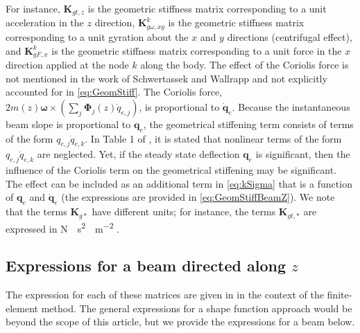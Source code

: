 \documentclass[wes, manuscript]{copernicus}
\renewcommand{\v}[1]{\boldsymbol{#1}}
\newcommand{\m}[1]{\boldsymbol{#1}}
\begin{document}
For instance, $\m{K}_{gt,z}$ is the geometric stiffness matrix corresponding to a unit acceleration in the $z$ direction, 
$\m{K}_{g\omega,xy}^k$ is the geometric stiffness matrix corresponding to a unit gyration about the $x$ and $y$ directions (centrifugal effect), and
    $\m{K}_{gF,x}^k$ is the geometric stiffness matrix corresponding to a unit force in the $x$ direction applied at the node $k$ along the body. 
The effect of the Coriolis force is not mentioned in the work of Schwertassek and Wallrapp and not explicitly accounted for in \autoref{eq:GeomStiff}. The Coriolis force, $2 m(z) \v{\omega} \times (\sum_j \v{\Phi}_j(z) \dot{q}_{e,j})$, is proportional to $\v{\dot{q}}_e$. Because the instantaneous beam slope is proportional to $\v{q}_e$, the geometrical stiffening term consists of terms of the form $q_{e,j}\dot{q}_{e,k}$.
In Table 1 of \cite{Wallrapp:1994}, it is stated that nonlinear terms of the form $q_{e,j}\dot{q}_{e,k}$ are neglected. 
Yet, if the steady state deflection $\v{q}_e$ is significant, then the influence of the Coriolis term on the geometrical stiffening may be significant. The effect can be included as an additional term in  \autoref{eq:kSigma} that is a function of $\v{q}_e$ and $\v{\dot{q}}_e$ (the expressions are provided in \autoref{eq:GeomStiffBeamZ}).
% 
% 
% 
% 
% 
We note that the terms $\m{K}_{g*}$ have different units; for instance, the terms $\m{K}_{gt,*}$ are expressed in \unit{N\cdot s^2 \cdot m^{-2}} .

\subsection{Expressions for a beam directed along $z$}
\label{eq:GeomStiffBeamZ}
The expression for each of these matrices are given in \cite{Schwertassek:book} in the context of the finite-element method.  The general expressions for a shape function approach would be beyond the scope of this article, but we provide the expressions for a beam below.
\end{document}
